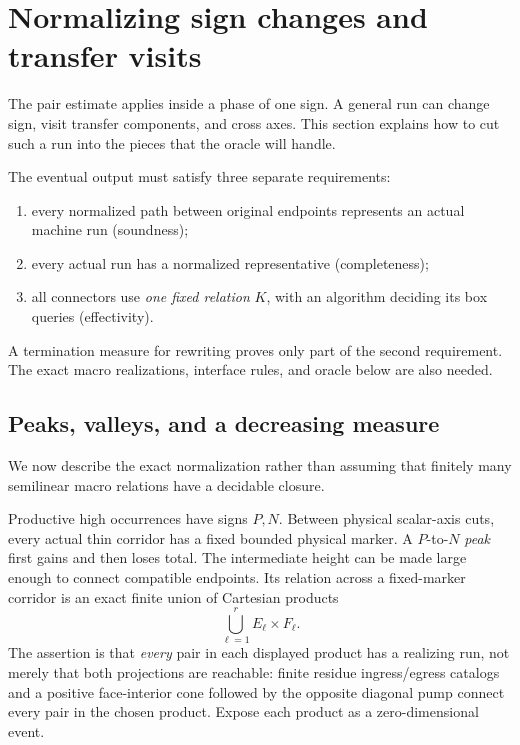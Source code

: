 \documentclass[11pt,a4paper]{article}
\theoremstyle{remark}
\begin{document}
\section{Normalizing sign changes and transfer visits}\label{sec:normal}

The pair estimate applies inside a phase of one sign. A general run
can change sign, visit transfer components, and cross axes. This
section explains how to cut such a run into the pieces that the oracle
will handle.

The eventual output must satisfy three separate requirements:
\begin{enumerate}[leftmargin=*]
\item every normalized path between original endpoints represents an
actual machine run (soundness);
\item every actual run has a normalized representative (completeness);
\item all connectors use \emph{one fixed relation} \(K\), with an
algorithm deciding its box queries (effectivity).
\end{enumerate}
A termination measure for rewriting proves only part of the second
requirement. The exact macro realizations, interface rules, and oracle
below are also needed.

\subsection{Peaks, valleys, and a decreasing measure}

We now describe the exact normalization rather than assuming that finitely many semilinear macro relations have a decidable closure.

Productive high occurrences have signs \(P,N\). Between physical scalar-axis cuts, every actual thin corridor has a fixed bounded physical marker. A \(P\)-to-\(N\) \emph{peak} first gains and then loses total.
The intermediate height can be made large enough to connect compatible
endpoints. Its relation across a fixed-marker corridor is an exact
finite union of Cartesian products
\[
 \bigcup_{\ell=1}^r E_\ell\times F_\ell.
\]
The assertion is that \emph{every} pair in each displayed product has
a realizing run, not merely that both projections are reachable:
 finite residue ingress/egress catalogs and a positive face-interior cone followed by the opposite diagonal pump connect every pair in the chosen product. Expose each product as a zero-dimensional event.
\end{document}
